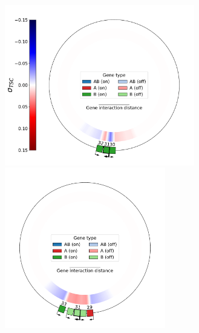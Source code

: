 \begin{figure}[H]
  \centering
  \begin{subfigure}[t]{\textwidth}
    \centering
    \includegraphics[height=7cm]{ploscb/img/sub_3_genes_30_env_A.pdf}
    \hspace{-0.5cm}
    \includegraphics[height=7cm]{ploscb/img/sub_5_genes_29_env_A.pdf}
  \end{subfigure}


\end{figure}
